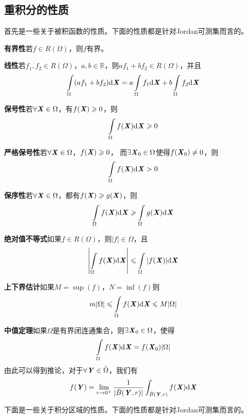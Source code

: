 \documentclass[UTF8,openany]{book}
\begin{document}
	\subsection{重积分的性质}
	首先是一些关于被积函数的性质。下面的性质都是针对Jordan可测集而言的。
	\par \textbf{有界性}\quad 若$f\in R(\Omega)$，则$f$有界。
	\par \textbf{线性}\quad 若$f_1,f_2\in R(\Omega)$，$a,b\in\mathbb{R}$，则$af_1+bf_2\in R(\Omega)$，并且
	$$\int\limits_{\Omega}(af_1+bf_2)\mathrm{d}\textbf{\textit{X}}=
	a\int\limits_{\Omega}f_1\mathrm{d}\textbf{\textit{X}}+b\int\limits_{\Omega}f_2\mathrm{d}\textbf{\textit{X}}$$
	\par \textbf{保号性}\quad 若$\forall \textbf{\textit{X}}\in\Omega$，有$f(\textbf{\textit{X}})\geqslant0$，则
	$$\int\limits_{\Omega}f(\textbf{\textit{X}})\mathrm{d}\textbf{\textit{X}}\geqslant0$$
	\par \textbf{严格保号性}\quad 若$\forall\textbf{\textit{X}}\in\Omega$，$f(\textbf{\textit{X}})\geqslant0$，
	而$\exists\textbf{\textit{X}}_0\in\Omega$使得$f(\textbf{\textit{X}}_0)\neq0$，则
	$$\int\limits_{\Omega}f(\textbf{\textit{X}})\mathrm{d}\textbf{\textit{X}}>0$$
	\par \textbf{保序性}\quad 若$\forall\textbf{\textit{X}}\in\Omega$，都有$f(\textbf{\textit{X}})\geqslant g(\textbf{\textit{X}})$，则
	$$\int\limits_{\Omega}f(\textbf{\textit{X}})\mathrm{d}\textbf{\textit{X}}\geqslant
	\int\limits_{\Omega}g(\textbf{\textit{X}})\mathrm{d}\textbf{\textit{X}}$$
	\par \textbf{绝对值不等式}\quad 如果$f\in R(\Omega)$，则$|f|\in\Omega$，且
	$$\left|\int\limits_{\Omega}f(\textbf{\textit{X}})\mathrm{d}\textbf{\textit{X}}\right|\leqslant
	\int\limits_{\Omega}|f(\textbf{\textit{X}})|\mathrm{d}\textbf{\textit{X}}$$
	\par \textbf{上下界估计}\quad 如果$M=\sup(f)$，$N=\inf(f)$则
	$$m|\Omega|\leqslant\int\limits_{\Omega}f(\textbf{\textit{X}})\mathrm{d}\textbf{\textit{X}}\leqslant M|\Omega|$$
	\par \textbf{中值定理}\quad 如果$\Omega$是有界闭连通集合，则$\exists\textbf{\textit{X}}_0\in\Omega$，使得
	$$\int\limits_{\Omega}f(\textbf{\textit{X}})\mathrm{d}\textbf{\textit{X}}=f(\textbf{\textit{X}}_0)|\Omega|$$
	由此可以得到推论，对于$\forall\textbf{\textit{Y}}\in\mathring{\Omega}$，我们有
	$$f(\textbf{\textit{Y}})=\lim_{r\rightarrow0^+}\frac{1}{|\bar{B}(\textbf{\textit{Y}},r)|}\int_{\bar{B}(\textbf{\textit{Y}},r)}f(\textbf{\textit{X}})\mathrm{d}\textbf{\textit{X}}$$
	\par 下面是一些关于积分区域的性质。下面的性质都是针对Jordan可测集而言的。
\end{document}
